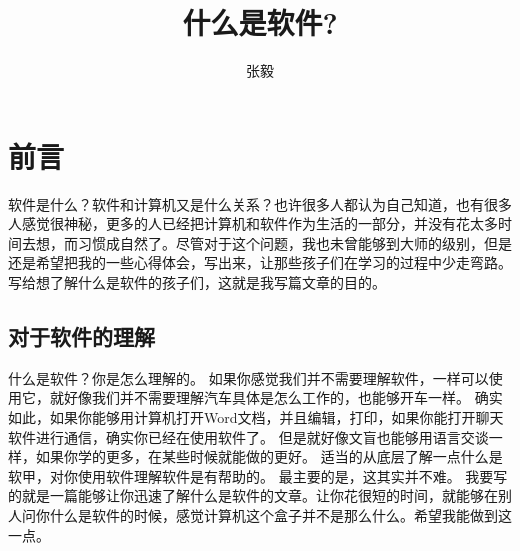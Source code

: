 \documentclass{article}
\title{什么是软件?}
\author{张毅}
\begin{document}
\maketitle
\tableofcontents
\newpage
\section{前言}
软件是什么？软件和计算机又是什么关系？也许很多人都认为自己知道，也有很多人感觉很神秘，更多的人已经把计算机和软件作为生活的一部分，并没有花太多时间去想，而习惯成自然了。尽管对于这个问题，我也未曾能够到大师的级别，但是还是希望把我的一些心得体会，写出来，让那些孩子们在学习的过程中少走弯路。写给想了解什么是软件的孩子们，这就是我写篇文章的目的。
\subsection{对于软件的理解}
什么是软件？你是怎么理解的。
如果你感觉我们并不需要理解软件，一样可以使用它，就好像我们并不需要理解汽车具体是怎么工作的，也能够开车一样。
确实如此，如果你能够用计算机打开Word文档，并且编辑，打印，如果你能打开聊天软件进行通信，确实你已经在使用软件了。
但是就好像文盲也能够用语言交谈一样，如果你学的更多，在某些时候就能做的更好。
适当的从底层了解一点什么是软甲，对你使用软件理解软件是有帮助的。
最主要的是，这其实并不难。
我要写的就是一篇能够让你迅速了解什么是软件的文章。让你花很短的时间，就能够在别人问你什么是软件的时候，感觉计算机这个盒子并不是那么什么。希望我能做到这一点。
\end{document}
